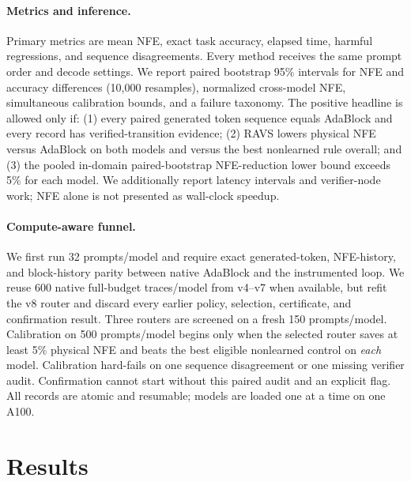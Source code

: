 \documentclass{article}
\newcommand{\method}{\textsc{RAVS}\xspace}
\begin{document}
\paragraph{Metrics and inference.}
Primary metrics are mean NFE, exact task accuracy, elapsed time, harmful regressions, and
sequence disagreements.
Every method receives the same prompt order and decode settings. We report paired bootstrap
95\% intervals for NFE and accuracy differences (10,000 resamples), normalized cross-model
NFE, simultaneous calibration bounds, and a failure taxonomy. The positive headline is
allowed only if: (1) every paired generated token sequence equals AdaBlock and every record has
verified-transition evidence; (2) \method lowers physical NFE versus AdaBlock on both models and
versus the best nonlearned rule overall; and (3) the pooled in-domain paired-bootstrap NFE-reduction
lower bound exceeds 5\% for each model. We additionally report latency intervals and verifier-node
work; NFE alone is not presented as wall-clock speedup.

\paragraph{Compute-aware funnel.}
We first run 32 prompts/model and require exact generated-token, NFE-history, and block-history
parity between native AdaBlock and the instrumented loop. We reuse 600 native full-budget
traces/model from v4--v7 when available, but refit the v8 router and discard every earlier policy,
selection, certificate, and confirmation result. Three routers are screened on a fresh 150
prompts/model. Calibration on 500 prompts/model begins only when the selected router saves at
least 5\% physical NFE and beats the best eligible nonlearned control on \emph{each} model.
Calibration hard-fails on one sequence disagreement or one missing verifier audit. Confirmation
cannot start without this paired audit and an explicit flag. All records are atomic and resumable;
models are loaded one at a time on one A100.

\section{Results}
\end{document}

